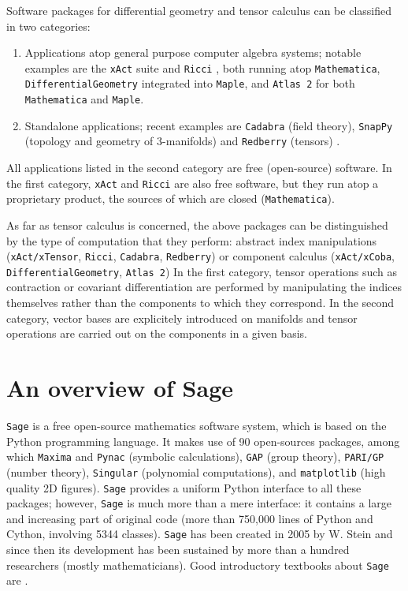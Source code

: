 \documentclass[a4paper]{jpconf}
\newcommand{\soft}[1]{\texttt{#1}}
\newcommand{\Sage}{\soft{Sage}{ }}
\begin{document}
Software packages for differential geometry and tensor calculus can be 
classified in two categories: 
\begin{enumerate}
\item Applications atop general purpose computer algebra systems; 
notable examples are 
the \soft{xAct} suite \cite{Marti08,xAct} and \soft{Ricci} \cite{Ricci}, both
running atop \soft{Mathematica},
\soft{DifferentialGeometry} \cite{AnderT12,DiffGeom} integrated into \soft{Maple}, and \soft{Atlas 2}
\cite{Atlas2} for both \soft{Mathematica} and \soft{Maple}.
\item Standalone applications; recent examples are \soft{Cadabra} \cite{Peete07,Cadabra} (field theory),
\soft{SnapPy} \cite{SnapPy} (topology and geometry of 3-manifolds) and
\soft{Redberry} (tensors) \cite{BolotP13,Redberry}.
\end{enumerate}
All applications listed in the second category are free (open-source) software. In
the first category, \soft{xAct} and \soft{Ricci} are also free software, but
they run atop a proprietary product, the sources of which are closed (\soft{Mathematica}). 

As far as tensor calculus is concerned, the above packages can be distinguished by 
the type of computation that they perform: abstract index manipulations 
(\soft{xAct/xTensor}, \soft{Ricci}, \soft{Cadabra}, \soft{Redberry})
or component calculus (\soft{xAct/xCoba}, \soft{DifferentialGeometry}, \soft{Atlas 2})
In the first category, tensor operations such as contraction or covariant differentiation 
are performed by manipulating the indices themselves rather than the components 
to which they correspond. In the second category, vector bases are explicitely 
introduced on manifolds and tensor operations are carried out on the components 
in a given basis.



\section{An overview of Sage}

\Sage \cite{sage} is a free open-source mathematics software system, which is
based on the Python programming language. It makes use of 90 open-sources packages, 
among which \soft{Maxima} and \soft{Pynac} (symbolic calculations),
\soft{GAP} (group theory), 
\soft{PARI/GP} (number theory), \soft{Singular} (polynomial computations), 
and \soft{matplotlib} (high quality 2D figures). 
\Sage provides a uniform Python interface to all these packages; however, 
\Sage is much more than a mere interface: it contains a large and increasing part of 
original code (more than 750,000 lines of Python and Cython, involving 5344 classes). 
\Sage has been created in 2005 by W. Stein \cite{SteinJ05} and since
then its development has been sustained by more than a hundred researchers
(mostly mathematicians). Good introductory textbooks about \Sage are
\cite{JoyneS14,Zimme13,Bard15}. 
 
\end{document}
